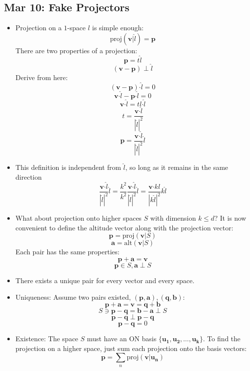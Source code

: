 \documentclass[10pt, oneside]{article}
\let\leq\leqslant
\newcommand{\Cdot}{\boldsymbol{\cdot}}
\renewcommand{\vec}[1]{\mathbf{#1}}
\begin{document}
\subsection{Mar 10: Fake Projectors}
\begin{itemize}
    \item Projection on a $1$-space $l$ is simple enough:
        \[\text{proj}(\vec{v}|\hat{l}) = \vec{p}\]
        There are two properties of a projection:
        \[\vec{p} = t\hat{l}\]
        \[(\vec{v} - \vec{p}) \perp \hat{l}\]
        Derive from here:
        \[(\vec{v} - \vec{p})\Cdot \hat{l} = 0\]
        \[\vec{v} \Cdot \hat{l} - \vec{p} \Cdot \hat{l} = 0\]
        \[\vec{v} \Cdot \hat{l} = t \hat{l} \Cdot \hat{l}\]
        \[t = \frac{\vec{v} \Cdot \hat{l}}{|\hat{l}|^2}\]
        \[\vec{p} = \frac{\vec{v} \Cdot \hat{l}}{|\hat{l}|^2} \hat{l}\]
    \item This definition is independent from $\hat{l}$, so long as it remains in the same direction
        \[\frac{\vec{v} \Cdot \hat{l}}{|\hat{l}|^2} \hat{l} = \frac{k^2}{k^2} \frac{\vec{v} \Cdot \hat{l}}{|\hat{l}|^2} \hat{l} = \frac{\vec{v} \Cdot k\hat{l}}{|k\hat{l}|^2} k\hat{l}\]
    \item What about projection onto higher spaces $S$ with dimension $k \leq d$? It is now convenient to define the altitude vector along with the projection vector:
        \[\vec{p} = \text{proj} (\vec{v}|S)\]
        \[\vec{a} = \text{alt} (\vec{v}|S)\]
        Each pair has the same properties:
        \[\vec{p} + \vec{a} = \vec{v}\]
        \[\vec{p} \in S, \vec{a} \perp S\]
    \item There exists a unique pair for every vector and every space.
    \item Uniqueness: Assume two pairs existed, $(\vec{p},\vec{a}), (\vec{q},\vec{b})$:
        \[\vec{p} + \vec{a} = \vec{v} = \vec{q} + \vec{b}\]
        \[S \ni \vec{p} - \vec{q} = \vec{b} - \vec{a} \perp S\]
        \[\vec{p} - \vec{q} \perp \vec{p} - \vec{q}\]
        \[\vec{p} - \vec{q} = 0\]
    \item Existence: The space $S$ must have an ON basis $\{\vec{u_1},\vec{u_2},\hdots,\vec{u_k}\}$. To find the projection on a higher space, just sum each projection onto the basis vectors:
        \[\vec{p} = \sum_n \text{proj}(\vec{v}|\vec{u_n})\]
\end{itemize}
\end{document}
